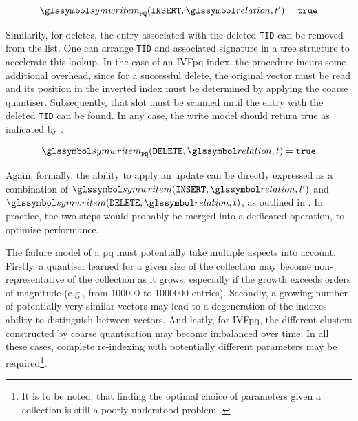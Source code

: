 \begin{equation}
    \label{equation:write_model_insert_pq}
    \symwritem_{\mathtt{PQ}}(\mathtt{INSERT}, \relation, t^{\prime}) = \mathtt{true}
\end{equation}

Similarily, for deletes, the entry associated with the deleted \texttt{TID} can be removed from the list. One can arrange \texttt{TID} and associated signature in a tree structure to accelerate this lookup. In the case of an IVF\acrshort{pq} index, the procedure incurs some additional overhead, since for a successful delete, the original vector must be read and its position in the inverted index must be determined by applying the coarse quantiser. Subsequently, that slot must be scanned until the entry with the deleted \texttt{TID} can be found. In any case, the write model should return true as indicated by .

\begin{equation}
    \label{equation:write_model_delete_pq}
    \symwritem_{\mathtt{PQ}}(\mathtt{DELETE}, \relation, t) = \mathtt{true}
\end{equation}

Again, formally, the ability to apply an update can be directly expressed as a combination of $\symwritem(\mathtt{INSERT}, \relation, t^{\prime})$ and $ \symwritem(\mathtt{DELETE}, \relation, t)$, as outlined in . In practice, the two steps would probably be merged into a dedicated operation, to optimise performance.

The failure model of a \acrshort{pq} must potentially take multiple aspects into account. Firstly, a quantiser learned for a given size of the collection may become non-representative of the collection as it grows, especially if the growth exceeds orders of magnitude (e.g., from $100000$ to $1000000$ entries). Secondly, a growing number of potentially very similar vectors may lead to a degeneration of the indexes ability to distinguish between vectors. And lastly, for IVF\acrshort{pq}, the different clusters constructed by coarse quantisation may become imbalanced over time. In all these cases, complete re-indexing with potentially different parameters may be required\footnote{It is to be noted, that finding the optimal choice of parameters given a collection is still a poorly understood problem \cite{Ge:2014Optimized}.}.